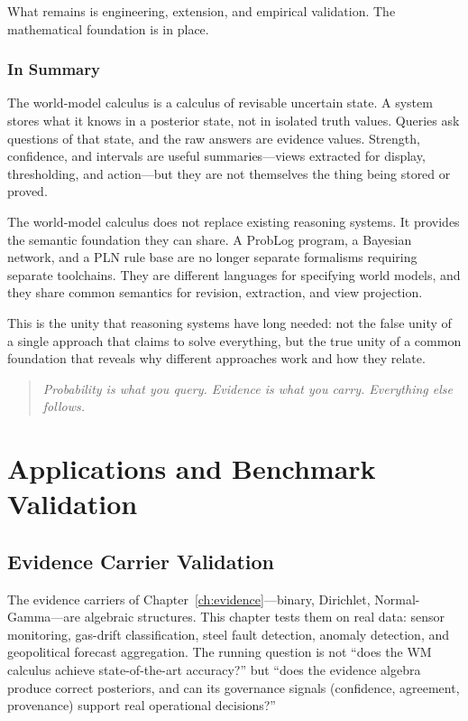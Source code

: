 \documentclass[11pt,openany]{report}
\begin{document}
What remains is engineering, extension, and empirical validation.
The mathematical foundation is in place.

\section*{In Summary}

The world-model calculus is a calculus of revisable uncertain state.
A system stores what it knows in a posterior state, not in isolated
truth values.  Queries ask questions of that state, and the raw
answers are evidence values.  Strength, confidence, and intervals are
useful summaries---views extracted for display, thresholding, and
action---but they are not themselves the thing being stored or proved.

The world-model calculus does not replace existing reasoning systems.
It provides the semantic foundation they can share.  A ProbLog
program, a Bayesian network, and a PLN rule base are no longer
separate formalisms requiring separate toolchains.  They are different
languages for specifying world models, and they share common semantics
for revision, extraction, and view projection.

This is the unity that reasoning systems have long needed: not the
false unity of a single approach that claims to solve everything, but
the true unity of a common foundation that reveals why different
approaches work and how they relate.

\begin{quote}
\emph{Probability is what you query.  Evidence is what you carry.
Everything else follows.}
\end{quote}



\part{Applications and Benchmark Validation}
\label{part:applications}

\chapter{Evidence Carrier Validation}
\label{ch:carrier-validation}

The evidence carriers of Chapter~\ref{ch:evidence}---binary,
Dirichlet, Normal-Gamma---are algebraic structures.  This chapter
tests them on real data: sensor monitoring, gas-drift
classification, steel fault detection, anomaly detection, and
geopolitical forecast aggregation.  The running question is not
``does the WM calculus achieve state-of-the-art accuracy?'' but
``does the evidence algebra produce correct posteriors, and can its
governance signals (confidence, agreement, provenance) support
real operational decisions?''
\end{document}
